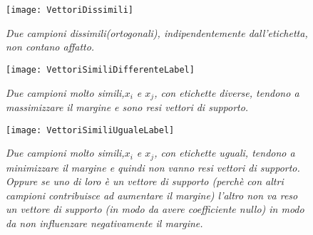 \begin{figure}[htp]
	\centering
	\texttt{[image: VettoriDissimili]}
	\caption[Campioni dissimili]{\textit{Due campioni dissimili(ortogonali), indipendentemente dall'etichetta, non contano affatto.}}
   \label{fig:dissp}
\end{figure}

\begin{figure}[htp]
	\centering
	\texttt{[image: VettoriSimiliDifferenteLabel]}
	\caption[Campioni simili differenti etichette]{\textit{Due campioni molto simili,$x_i$ e $x_j$, con etichette diverse, tendono a massimizzare il margine e sono resi vettori di supporto.}}
   \label{fig:simpdifflab}
\end{figure}

\begin{figure}[htp]
	\centering
	\texttt{[image: VettoriSimiliUgualeLabel]}
	\caption[Campioni simili differenti etichette]{\textit{Due campioni molto simili,$x_i$ e $x_j$, con etichette uguali, tendono a minimizzare il margine e quindi non vanno resi vettori di supporto. Oppure se uno di loro è un vettore di supporto (perchè con altri campioni contribuisce ad aumentare il margine) l'altro non va reso un vettore di supporto (in modo da avere coefficiente nullo) in modo da non influenzare negativamente il margine.}}
   \label{fig:simpsamelab}
\end{figure}

